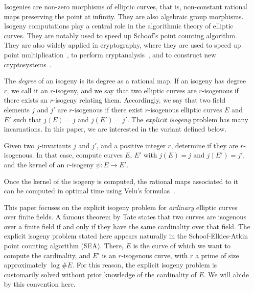 \documentclass{lms}
\begin{document}
Isogenies are non-zero morphisms of elliptic curves, that is,
non-constant rational maps preserving the point at infinity. They are
also algebraic group morphisms. Isogeny computations play a central
role in the algorithmic theory of elliptic curves. They are notably
used to speed up Schoof's point counting
algorithm\cite{schoof85,atkin88,elkies92,schoof95,elkies98}. They are
also widely applied in cryptography, where they are used to speed up
point multiplication~\cite{gallant+lambert+vanstone01,birkner+sica11},
to perform cryptanalysis~\cite{mauer+menezes+teske01}, and to
construct new
cryptosystems~\cite{teske06,charles+lauter+goren09,Stol,defeo+jao+plut12,jao+soukharev2014-signatures}.

The \emph{degree} of an isogeny is its degree as a rational map. If an
isogeny has degree $r$, we call it an $r$-isogeny, and we say that two
elliptic curves are $r$-isogenous if there exists an $r$-isogeny
relating them. Accordingly, we say that two field elements $j$ and
$j'$ are $r$-isogenous if there exist $r$-isogenous elliptic curves
$E$ and $E'$ such that $j(E)=j$ and $j(E')=j'$. The
\emph{explicit isogeny} problem has many incarnations. In this paper,
we are interested in the variant defined below.

\begin{prob} \label{prob:isogeny-problem}
  Given two $j$-invariants $j$ and $j'$, and a positive integer
  $r$, determine if they are $r$-isogenous. In that case, compute
  curves $E$, $E'$ with $j(E)=j$ and $j(E')=j'$, and the
  kernel of an $r$-isogeny $ψ:E\to E'$.
\end{prob}

Once the kernel of the isogeny is computed, the rational maps
associated to it can be computed in optimal time using Velu's
formulas~\cite{velu71}.

This paper focuses on the explicit isogeny problem for \emph{ordinary}
elliptic curves over finite fields. A famous theorem by Tate states
that two curves are isogenous over a finite field if and only if they
have the same cardinality over that field. The explicit isogeny
problem stated here appears naturally in the Schoof-Elkies-Atkin point
counting algorithm (SEA). There, $E$ is the curve of which we want to
compute the cardinality, and $E'$ is an $r$-isogenous curve, with $r$
a prime of size approximately $\log\#E$. For this reason, the explicit
isogeny problem is customarily solved without prior knowledge of the
cardinality of $E$. We will abide by this convention here.
\end{document}
